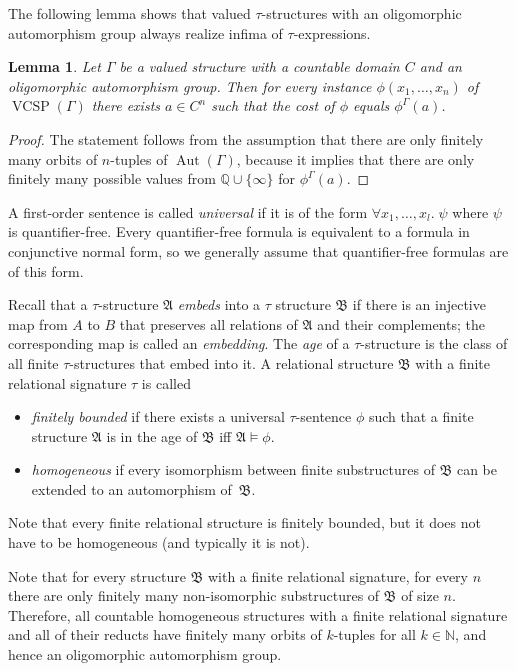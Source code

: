 \documentclass[nonacm]{acmart}
\newcommand{\N}{\mathbb N}
\newcommand{\bA}{{\mathfrak A}}
\newcommand{\bB}{{\mathfrak B}}
\DeclareMathOperator{\Aut}{Aut}
\DeclareMathOperator{\VCSP}{VCSP}
\newtheorem{lemma}[theorem]{Lemma}
\begin{document}
The following lemma shows that valued $\tau$-structures with an oligomorphic automorphism group always realize infima of $\tau$-expressions.
\begin{lemma}\label{lem:cost} 
Let $\Gamma$ be a valued structure with a countable domain $C$ and an oligomorphic automorphism group. Then 
for every instance $\phi(x_1,\dots,x_n)$ of $\VCSP(\Gamma)$ there exists $a \in C^n$ 
such that the cost of $\phi$ equals $\phi^{\Gamma}(a)$. 
\end{lemma}
\begin{proof}
The statement follows from the assumption that there are only finitely many orbits of $n$-tuples of $\Aut(\Gamma)$, because it implies that there are only finitely many possible values from ${\mathbb Q} \cup \{\infty\}$ for $\phi^{\Gamma}(a)$. 
\end{proof}

A first-order sentence is called \emph{universal} if it is of the form $\forall x_1,\dots,x_l.\; \psi$ where $\psi$ is quantifier-free. Every quantifier-free formula is equivalent to a formula in conjunctive normal form, so we generally assume that quantifier-free formulas are of this form.

Recall that a $\tau$-structure $\bA$ \emph{embeds} into a $\tau$ structure $\bB$ if there is an injective map from $A$ to $B$ that preserves all relations of $\bA$ and their complements; the corresponding map is called an \emph{embedding}. The \emph{age} of a $\tau$-structure is the class of all finite $\tau$-structures that embed into it.
A relational structure $\bB$ with a finite relational signature $\tau$ is called 
\begin{itemize}
    \item \emph{finitely bounded} if there exists a universal $\tau$-sentence $\phi$ such that a finite structure $\bA$
    is in the age of $\bB$ 
iff $\bA \models \phi$. 
    \item \emph{homogeneous} if every isomorphism between finite substructures of $\bB$ can be extended to an automorphism of~$\bB$.  
\end{itemize}
Note that every finite relational structure is finitely bounded, but it does not have to be homogeneous (and typically it is not).

Note that for every 
structure $\bB$ with a finite relational signature, for every $n$ there are only finitely many non-isomorphic substructures of $\bB$ of size $n$. Therefore, all countable homogeneous structures with a finite relational signature and all of their reducts have finitely many orbits of $k$-tuples for all $k \in \N$, and hence an oligomorphic automorphism group.
\end{document}
